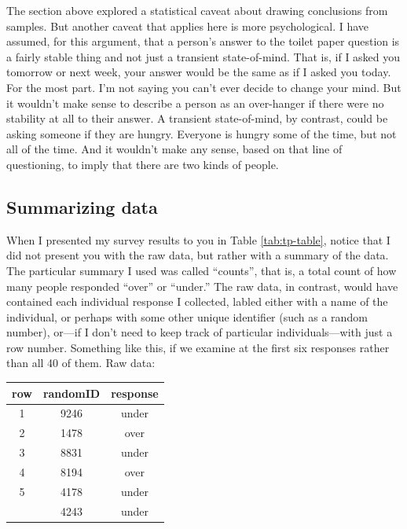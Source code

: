 \documentclass[openany]{book}
\begin{document}
The section above explored a statistical caveat about drawing conclusions from samples. But another caveat that applies here is more psychological. I have assumed, for this argument, that a person's answer to the toilet paper question is a fairly stable thing and not just a transient state-of-mind. That is, if I asked you tomorrow or next week, your answer would be the same as if I asked you today. For the most part. I'm not saying you can't ever decide to change your mind. But it wouldn't make sense to describe a person as an over-hanger if there were no stability at all to their answer. A transient state-of-mind, by contrast, could be asking someone if they are hungry. Everyone is hungry some of the time, but not all of the time. And it wouldn't make any sense, based on that line of questioning, to imply that there are two kinds of people.

\hypertarget{summarizing-data}{%
\subsection*{Summarizing data}\label{summarizing-data}}

When I presented my survey results to you in Table \ref{tab:tp-table}, notice that I did not present you with the raw data, but rather with a summary of the data. The particular summary I used was called ``counts'', that is, a total count of how many people responded ``over'' or ``under.'' The raw data, in contrast, would have contained each individual response I collected, labled either with a name of the individual, or perhaps with some other unique identifier (such as a random number), or---if I don't need to keep track of particular individuals---with just a row number. Something like this, if we examine at the first six responses rather than all 40 of them. Raw data:

\begin{table}[!h]
\centering
\begin{tabular}{ccc}
\toprule
row & randomID & response\\
\midrule
1 & 9246 & under\\
2 & 1478 & over\\
3 & 8831 & under\\
4 & 8194 & over\\
5 & 4178 & under\\
\addlinespace
6 & 4243 & under\\
\bottomrule
\end{tabular}
\end{table}
\end{document}
